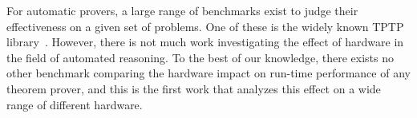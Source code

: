 For automatic provers, a large range of benchmarks exist to judge their effectiveness on a given set of problems. 
One of these is the widely known TPTP library~\cite{TPTP2009Sutcliffe}.
However, there is not much work investigating the effect of hardware in the field of automated reasoning.
To the best of our knowledge,
there exists no other benchmark comparing the hardware impact on run-time performance of any theorem prover,
and this is the first work that analyzes this effect on a wide range of different hardware.